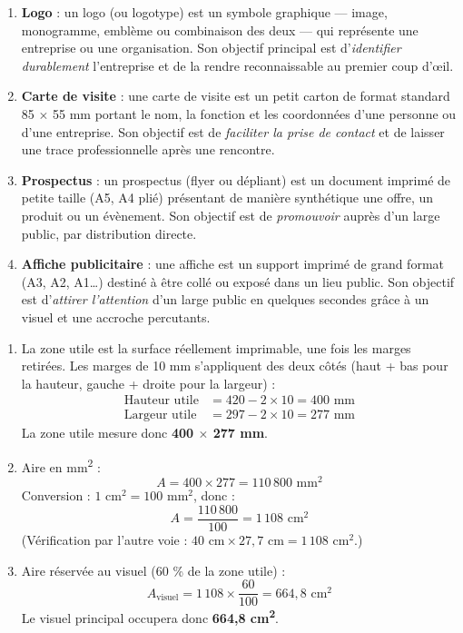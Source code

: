 \documentclass[11pt]{article}
\begin{document}
\begin{corrige}
\begin{enumerate}
\item \textbf{Logo} : un logo (ou logotype) est un symbole graphique — image, monogramme, emblème ou combinaison des deux — qui représente une entreprise ou une organisation. Son objectif principal est d'\emph{identifier durablement} l'entreprise et de la rendre reconnaissable au premier coup d'œil.
\item \textbf{Carte de visite} : une carte de visite est un petit carton de format standard 85 $\times$ 55 mm portant le nom, la fonction et les coordonnées d'une personne ou d'une entreprise. Son objectif est de \emph{faciliter la prise de contact} et de laisser une trace professionnelle après une rencontre.
\item \textbf{Prospectus} : un prospectus (flyer ou dépliant) est un document imprimé de petite taille (A5, A4 plié) présentant de manière synthétique une offre, un produit ou un évènement. Son objectif est de \emph{promouvoir} auprès d'un large public, par distribution directe.
\item \textbf{Affiche publicitaire} : une affiche est un support imprimé de grand format (A3, A2, A1\ldots) destiné à être collé ou exposé dans un lieu public. Son objectif est d'\emph{attirer l'attention} d'un large public en quelques secondes grâce à un visuel et une accroche percutants.
\end{enumerate}
\end{corrige}

\begin{corrige}
\begin{enumerate}
\item La zone utile est la surface réellement imprimable, une fois les marges retirées. Les marges de 10 mm s'appliquent des deux côtés (haut + bas pour la hauteur, gauche + droite pour la largeur) :
\begin{align*}
\text{Hauteur utile} &= 420 - 2 \times 10 = 400 \text{ mm}\\
\text{Largeur utile} &= 297 - 2 \times 10 = 277 \text{ mm}
\end{align*}
La zone utile mesure donc \textbf{400 $\times$ 277 mm}.
\item Aire en mm\textsuperscript{2} :
\[ A = 400 \times 277 = 110\,800 \text{ mm}^2 \]
Conversion : $1 \text{ cm}^2 = 100 \text{ mm}^2$, donc :
\[ A = \dfrac{110\,800}{100} = 1\,108 \text{ cm}^2 \]
(Vérification par l'autre voie : $40 \text{ cm} \times 27{,}7 \text{ cm} = 1\,108 \text{ cm}^2$.)
\item Aire réservée au visuel (60 \% de la zone utile) :
\[ A_{\text{visuel}} = 1\,108 \times \dfrac{60}{100} = 664{,}8 \text{ cm}^2 \]
Le visuel principal occupera donc \textbf{664,8 cm\textsuperscript{2}}.
\end{enumerate}
\end{corrige}
\end{document}
